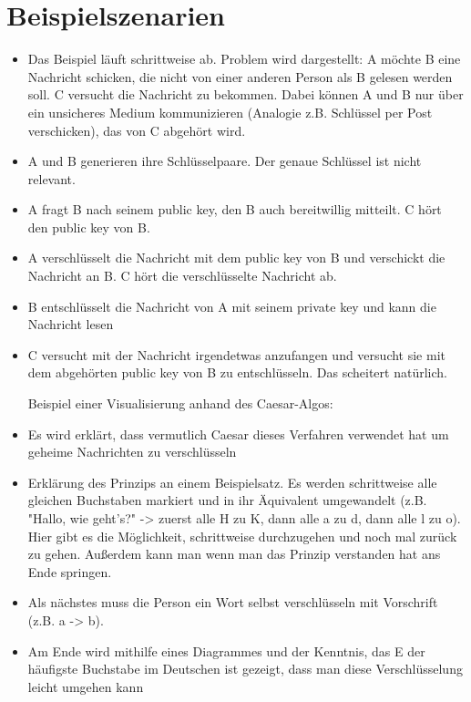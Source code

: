\documentclass{article}
\begin{document}
\section{Beispielszenarien}
\begin{itemize}
    \item Das Beispiel läuft schrittweise ab. Problem wird dargestellt: A möchte B eine Nachricht schicken, die nicht von einer anderen Person als B gelesen werden soll. C versucht die Nachricht zu bekommen. Dabei können A und B nur über ein unsicheres Medium kommunizieren (Analogie z.B. Schlüssel per Post verschicken), das von C abgehört wird.
\item A und B generieren ihre Schlüsselpaare. Der genaue Schlüssel ist nicht relevant.
\item A fragt B nach seinem public key, den B auch bereitwillig mitteilt. C hört den public key von B.
\item A verschlüsselt die Nachricht mit dem public key von B und verschickt die Nachricht an B. C hört die verschlüsselte Nachricht ab.
\item B entschlüsselt die Nachricht von A mit seinem private key und kann die Nachricht lesen
\item C versucht mit der Nachricht irgendetwas anzufangen und versucht sie mit dem abgehörten public key von B zu entschlüsseln. Das scheitert natürlich.

Beispiel einer Visualisierung anhand des Caesar-Algos:

\item Es wird erklärt, dass vermutlich Caesar dieses Verfahren verwendet hat um geheime Nachrichten zu verschlüsseln
\item Erklärung des Prinzips an einem Beispielsatz. Es werden schrittweise alle gleichen Buchstaben markiert und in ihr Äquivalent umgewandelt (z.B. "Hallo, wie geht's?" -> zuerst alle H zu K, dann alle a zu d, dann alle l zu o). Hier gibt es die Möglichkeit, schrittweise durchzugehen und noch mal zurück zu gehen. Außerdem kann man wenn man das Prinzip verstanden hat ans Ende springen.
\item Als nächstes muss die Person ein Wort selbst verschlüsseln mit Vorschrift (z.B. a -> b).
\item Am Ende wird mithilfe eines Diagrammes und der Kenntnis, das E der häufigste Buchstabe im Deutschen ist gezeigt, dass man diese Verschlüsselung leicht umgehen kann
\end{itemize}
\end{document}

